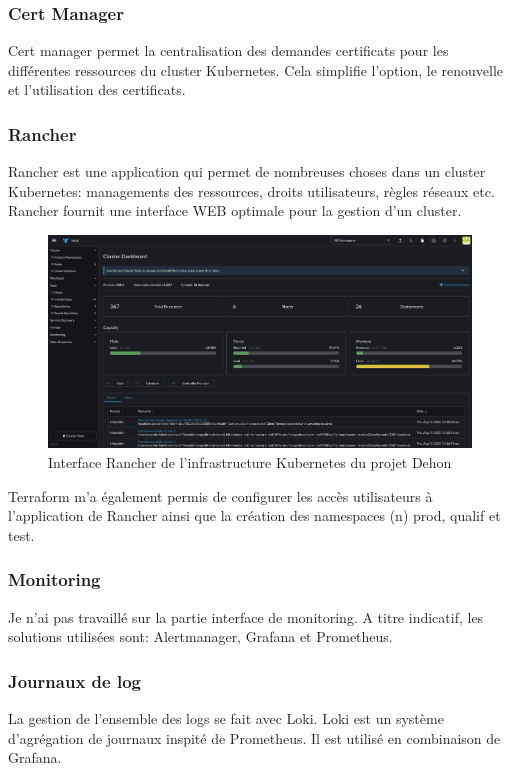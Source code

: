 \documentclass[12pt]{article}
\begin{document}
\subsubsection{Cert Manager}
Cert manager permet la centralisation des demandes certificats pour les différentes ressources du \gls{cluster} \gls{Kubernetes}.
Cela simplifie l'option, le renouvelle et l'utilisation des certificats.

\subsubsection{Rancher}
Rancher est une application qui permet de nombreuses choses dans un \gls{cluster} \gls{Kubernetes}: managements des ressources, droits utilisateurs, règles réseaux etc. 
Rancher fournit une interface WEB optimale pour la gestion d'un \gls{cluster}.

\begin{figure}[!ht]
    \centering
        \includegraphics[width=\textwidth]{src/interface_rancher.png}
    \caption{Interface Rancher de l'infrastructure \gls{Kubernetes} du projet Dehon}
    \label{fig:rancher_interface}
\end{figure}

\gls{Terraform} m'a également permis de configurer les accès utilisateurs à l'application de Rancher ainsi que la création des namespaces (n) prod, qualif et test.

\subsubsection{Monitoring}
Je n'ai pas travaillé sur la partie interface de monitoring.
A titre indicatif, les solutions utilisées sont: Alertmanager, Grafana et Prometheus.

\subsubsection{Journaux de log}
La gestion de l'ensemble des logs se fait avec Loki.
Loki est un système d'agrégation de journaux inspité de Prometheus.
Il est utilisé en combinaison de Grafana.
\end{document}
